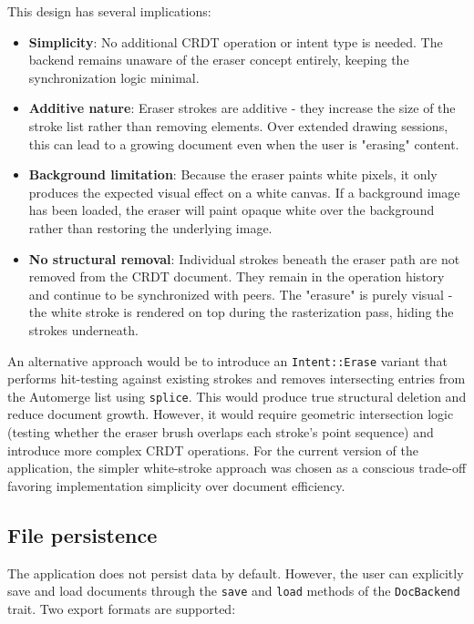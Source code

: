 \documentclass[a4paper,11pt,twoside]{report}
\theoremstyle{definition}
\begin{document}
This design has several implications:

\begin{itemize}
    \item \textbf{Simplicity}: No additional CRDT operation or intent type is needed. The 
    backend remains unaware of the eraser concept entirely, keeping the synchronization logic 
    minimal.
    \item \textbf{Additive nature}: Eraser strokes are additive - they increase the size of 
    the stroke list rather than removing elements. Over extended drawing sessions, this can 
    lead to a growing document even when the user is "erasing" content.
    \item \textbf{Background limitation}: Because the eraser paints white pixels, it only 
    produces the expected visual effect on a white canvas. If a background image has been 
    loaded, the eraser will paint opaque white over the background rather than restoring the 
    underlying image.
    \item \textbf{No structural removal}: Individual strokes beneath the eraser path are not 
    removed from the CRDT document. They remain in the operation history and continue to be 
    synchronized with peers. The "erasure" is purely visual - the white stroke is rendered 
    on top during the rasterization pass, hiding the strokes underneath.
\end{itemize}

An alternative approach would be to introduce an \texttt{Intent::Erase} variant that performs 
hit-testing against existing strokes and removes intersecting entries from the Automerge list 
using \texttt{splice}. This would produce true structural deletion and reduce document growth. 
However, it would require geometric intersection logic (testing whether the eraser brush 
overlaps each stroke's point sequence) and introduce more complex CRDT operations. For the 
current version of the application, the simpler white-stroke approach was chosen as a 
conscious trade-off favoring implementation simplicity over document efficiency.

\subsection{File persistence}

The application does not persist data by default. However, the user can explicitly save and 
load documents through the \texttt{save} and \texttt{load} methods of the \texttt{DocBackend} 
trait. Two export formats are supported:
\end{document}
